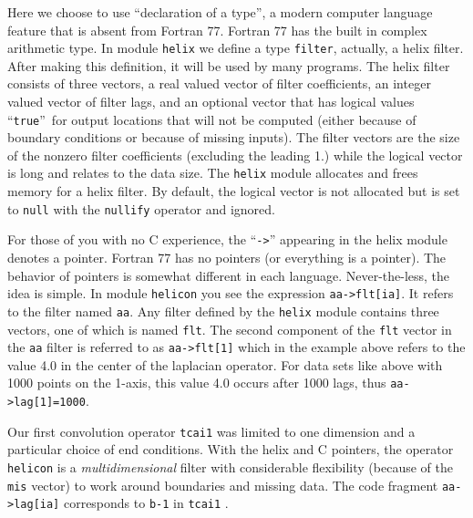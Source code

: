 \par
Here we choose to use
``declaration of a type'',
a modern computer language feature that is absent from Fortran 77.
Fortran 77 has the built in complex arithmetic type.
In module \texttt{helix}
we define a type \texttt{filter}, actually, a helix filter.
After making this definition, it will be used by many programs.
The helix filter consists of three vectors,
a real valued vector of filter coefficients,
an integer valued vector of filter lags,
and an optional vector
that has logical values ``\texttt{true}''~for
output locations that will not be computed
(either because of boundary conditions or because of missing inputs).
The filter vectors are the size of the nonzero filter coefficients
(excluding the leading 1.) while the logical vector is long
and relates to the data size.
The \texttt{helix} module allocates and frees memory for a helix filter.
By default, the logical vector is not allocated but
is set to \texttt{null}
with the \texttt{nullify} operator and ignored.
\par
For those of you with no C  experience,
the ``\verb#->#'' appearing in the helix module denotes a pointer.
Fortran 77 has no pointers (or everything is a pointer).
The behavior of pointers is somewhat different in each language.
Never-the-less, the idea is simple.
In module \texttt{helicon} %
you see the expression
\verb#aa->flt[ia]#.
It refers to the filter named \texttt{aa}.
Any filter defined by the \texttt{helix} module
contains three vectors, one of which is named \texttt{flt}.
The second component of the \texttt{flt} vector
in the \texttt{aa} filter
is referred to as
\verb#aa->flt[1]# which
in the example above refers to the value 4.0
in the center of the laplacian operator.
For data sets like above with 1000 points on the 1-axis,
this value 4.0 occurs after 1000 lags,
thus \verb#aa->lag[1]=1000#.

\par
Our first convolution operator
\texttt{tcai1}
was limited to one dimension and a particular choice of end conditions.
With the helix and C pointers,
the operator
\texttt{helicon} %
is a {\it multidimensional} filter
with considerable flexibility (because of the \texttt{mis} vector)
to work around boundaries and missing data.
The code fragment
\verb#aa->lag[ia]#
corresponds to 
\texttt{b-1}
in \texttt{tcai1} .


